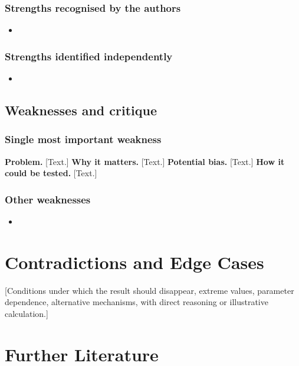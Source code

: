 \documentclass{lrreview}
\begin{document}
\subsubsection{Strengths recognised by the authors}
\begin{itemize}
  \item{}
\end{itemize}
\subsubsection{Strengths identified independently}
\begin{itemize}
  \item{}
\end{itemize}

\subsection{Weaknesses and critique}
\subsubsection{Single most important weakness}
\textbf{Problem.} [Text.] \textbf{Why it matters.} [Text.] \textbf{Potential bias.} [Text.]
\textbf{How it could be tested.} [Text.]
\subsubsection{Other weaknesses}
\begin{itemize}
  \item{}
\end{itemize}

\section{Contradictions and Edge Cases}
 [Conditions under which the result should disappear, extreme
values, parameter dependence, alternative mechanisms, with direct reasoning or
illustrative calculation.]

\section{Further Literature}
\end{document}
